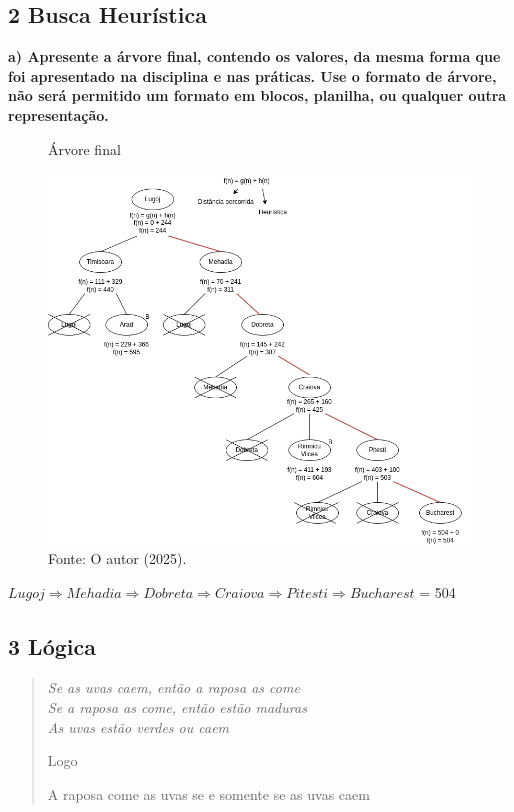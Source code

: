 \subsection*{\textbf{2 Busca Heurística}}

\begin{adjustwidth}{1em}{}
\textbf{a) Apresente a árvore final, contendo os valores, da mesma forma que foi apresentado
na disciplina e nas práticas. Use o formato de árvore, não será permitido um formato em blocos,
planilha, ou qualquer outra representação.}
\end{adjustwidth}

\begin{figure}[H]
\centering
\caption{Árvore final}
\includegraphics[width=0.8\linewidth]{apendices/fig/1_IAA001_4.png}
\caption*{Fonte: O autor (2025).}
\label{arvoreF}
\end{figure}

$Lugoj \Rightarrow Mehadia \Rightarrow Dobreta \Rightarrow Craiova \Rightarrow Pitesti \Rightarrow Bucharest$ = 504

\subsection*{\textbf{3 Lógica}}
\begin{adjustwidth}{3em}{}
\begin{quote}
    \itshape
    Se as uvas caem, então a raposa as come \\
    Se a raposa as come, então estão maduras \\
    As uvas estão verdes ou caem

    Logo

    A raposa come as uvas se e somente se as uvas caem
\end{quote}
\end{adjustwidth}

